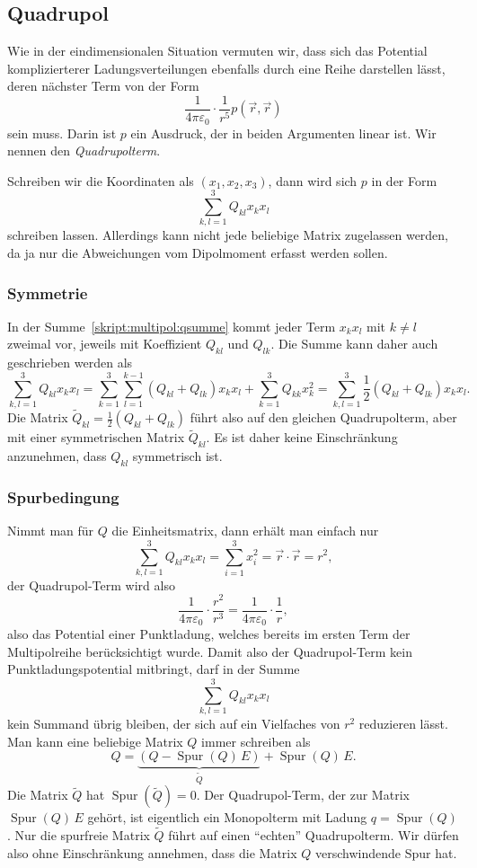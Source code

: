 \subsection{Quadrupol}
Wie in der eindimensionalen Situation vermuten wir, dass sich
das Potential komplizierterer Ladungsverteilungen ebenfalls durch
eine Reihe darstellen lässt, deren nächster Term von der Form
\begin{equation}
\frac1{4\pi\varepsilon_0}\cdot\frac{1}{r^5} p(\vec{r},\vec{r})
\label{skript:multipol:quadropolterm}
\end{equation}
sein muss.
Darin ist $p$ ein Ausdruck, der in beiden Argumenten linear ist.
Wir nennen \label{skript:multipol:quadropolterm} den {\em Quadrupolterm}.
%

Schreiben wir die Koordinaten als $(x_1,x_2,x_3)$, dann wird 
sich $p$ in der Form
\begin{equation}
\sum_{k,l=1}^3 Q_{kl}x_kx_l
\label{skript:multipol:qsumme}
\end{equation}
schreiben lassen.
Allerdings kann nicht jede beliebige Matrix zugelassen werden, 
da ja nur die Abweichungen vom Dipolmoment erfasst werden sollen.

\subsubsection{Symmetrie}
In der Summe~\eqref{skript:multipol:qsumme} kommt jeder Term
$x_kx_l$ mit $k\ne l$ zweimal vor, jeweils mit Koeffizient $Q_{kl}$
und $Q_{lk}$.
Die Summe kann daher auch geschrieben werden als
\[
\sum_{k,l=1}^3 Q_{kl}x_kx_l
=
\sum_{k=1}^3 \sum_{l=1}^{k-1} (Q_{kl}+Q_{lk})x_kx_l
+
\sum_{k=1}^3 Q_{kk}x_k^2
=
\sum_{k,l=1}^3 \frac12(Q_{kl}+Q_{lk}) x_kx_l.
\]
Die Matrix $\tilde Q_{kl}=\frac12(Q_{kl}+Q_{lk})$ führt also auf den
gleichen Quadrupolterm, aber mit einer symmetrischen Matrix $\tilde Q_{kl}$.
Es ist daher keine Einschränkung anzunehmen, dass $Q_{kl}$ symmetrisch ist.

\subsubsection{Spurbedingung}
Nimmt man für $Q$ die Einheitsmatrix, dann erhält man einfach nur
\[
\sum_{k,l=1}^3 Q_{kl}x_kx_l=\sum_{i=1}^3 x_i^2 = \vec{r}\cdot\vec{r}=r^2,
\]
der Quadrupol-Term wird also 
\[
\frac1{4\pi\varepsilon_0}\cdot\frac{r^2}{r^3}
=
\frac1{4\pi\varepsilon_0}\cdot\frac{1}{r},
\]
also das Potential einer Punktladung, welches bereits im ersten Term
der Multipolreihe berücksichtigt wurde.
Damit also der Quadrupol-Term kein Punktladungspotential mitbringt,
darf in der Summe
\[
\sum_{k,l=1}^3Q_{kl}x_kx_l
\]
kein Summand übrig bleiben, der sich auf ein Vielfaches von $r^2$ 
reduzieren lässt.
Man kann eine beliebige Matrix $Q$ immer schreiben als
\[
Q = \underbrace{(Q - \operatorname{Spur}(Q)\, E)}_{\displaystyle \tilde Q} + \operatorname{Spur} (Q)\, E.
\]
Die Matrix $\tilde Q$ hat $\operatorname{Spur}(\tilde Q)=0$.
Der Quadrupol-Term, der zur Matrix $\operatorname{Spur}(Q)\,E$ gehört,
ist eigentlich ein Monopolterm mit Ladung $q=\operatorname{Spur}(Q)$.
Nur die spurfreie Matrix $\tilde Q$ führt auf einen ``echten'' Quadrupolterm.
Wir dürfen also ohne Einschränkung annehmen, dass die Matrix $Q$ verschwindende
Spur hat.

